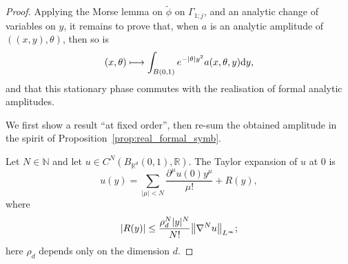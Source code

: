 \documentclass[AHL,Unicode,longabstracts,published]{cedram}
\newcommand\1{\mathds{1}}
\newcommand{\R}{\mathbb{R}}
\newcommand{\N}{\mathbb{N}}
\newcommand{\dd}{\mathrm{d}}
\let\oldmapsto\mapsto
\renewcommand*{\mapsto}{\mathchoice{\longmapsto}{\oldmapsto}{\oldmapsto}{\oldmapsto}}
\let\originalleft\left
\let\originalright\right
\renewcommand{\left}{\mathopen{}\mathclose\bgroup\originalleft}
\renewcommand{\right}{\aftergroup\egroup\originalright}
\begin{document}
\begin{proof}
Applying the Morse lemma on $\widetilde{\phi}$ on $\Gamma_{1;j}$, and an analytic change of variables on $y$, it remains to prove that, when $a$ is an analytic amplitude of $((x,y),\theta)$, then so is
\begin{equation}\label{eq:std_phase}
(x,\theta)\mapsto \int_{B(0,1)}e^{-|\theta|y^2}a(x,\theta,y)\dd y,
\end{equation}
and that this stationary phase commutes with the realisation of formal analytic amplitudes.

We first show a result ``at fixed order'', then re-sum the obtained amplitude in the spirit of Proposition~\ref{prop:real_formal_symb}.

Let $N\in \N$ and let $u\in C^N(B_{\R^d}(0,1),\R)$. The Taylor expansion of $u$ at $0$ is
\[
u(y)=\sum_{|\mu|<N}\frac{\partial^{\mu}u(0)y^{\mu}}{\mu!}+R(y),
\]
where
\[
|R(y)|\leq \frac{\rho_d^N|y|^N}{N!}\left\|\nabla^Nu\right\|_{L^{\infty}};
\]
here $\rho_d$ depends only on the dimension $d$.


\end{proof}
\end{document}
